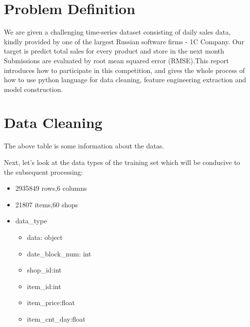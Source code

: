 \section{Problem Definition}
    We are given a challenging time-series dataset consisting of daily sales data, kindly provided by one of the largest Russian software firms - 1C Company.
    Our target is predict total sales for every product and store in the next month
    Submissions are evaluated by root mean squared error (RMSE).This report introduces how to participate in this competition, and gives the whole process of how to use python language for data cleaning, feature engineering extraction and model construction.
\section{Data Cleaning}
\begin{table}[h]
    \begin{center}
    \end{center}
    \caption{Data Infomation}
  \end{table}
  The above table is some information about the datas.\par
  Next, let's look at the data types of the training set which will be conducive to the subsequent processing:
  \begin{itemize}
    \item 2935849 rows,6 columns
    \item 21807 items,60 shops
    \item data_type
          \begin{itemize}
            \item data: object
            \item date_block_num: int
            \item shop_id:int
            \item item_id:int
            \item item_price:float
            \item item_cnt_day:float
          \end{itemize}
  \end{itemize}
